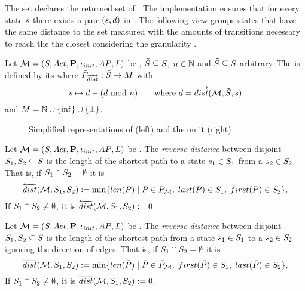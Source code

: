 \documentclass[preview]{standalone}
\begin{document}
The set \fctdistdefault declares the returned set of . The implementation ensures that for every state ${s}$ there exists a pair $({s}, {d})$ in \fctdistdefault. The following view groups states that have the same distance to the set measured with the amounts of transitions necessary to reach the the closest \smstates considering the granularity \grandist.

\begin{definition}
		Let ${{{\mathcal{M}}}} = {{({S}, {Act}, {\textbf{P}}, {\iota_{init}}, {AP}, {L})}}$ be \achgphN, ${\tilde{{S}}} \subseteq {S}$, $n \in {\mathbb{N}}$ and ${\tilde{{S}}} \subseteq {S}$ arbitrary.  The \viewN \viewdistance is defined by its \grpfctN where ${{\tilde{F}_{{{\overrightarrow{dist}}}}}} : {\tilde{{S}}} \to {\ensuremath{{M}}}$ with 
		\[
		{s} \mapsto {d} - ({d} \text{ mod } n) \quad \quad \text{where } {d} = {\overrightarrow{dist}}({{{\mathcal{M}}}},{\tilde{{S}}}, {s})
		\]
		and ${{M}} = {\mathbb{N}} \cup \{\inf\} \cup {\{\bot\}}$.
\end{definition}

\begin{figure}[h]
	\begin{minipage}{.6\textwidth}
		
	\end{minipage}%
	\begin{minipage}{.5\textwidth}
		
	\end{minipage}
	\caption{Simplified representations of \mdp (left) and the \viewN \viewdistance on it (right)}
	\label{fig:Distance}  
\end{figure}

\begin{definition}
	Let ${{{\mathcal{M}}}} = {{({S}, {Act}, {\textbf{P}}, {\iota_{init}}, {AP}, {L})}}$ be \achgphN. The \emph{reverse distance} between disjoint ${S}_1, {S}_2 \subseteq {S}$ is the length of the shortest path to a state ${s}_1 \in {S}_1$ from a ${s}_2 \in {S}_2$. That is, if ${S}_1 \cap {S}_2 = \emptyset$ it is		
	\[
	\distpathrev(\chgph, \states_1, \states_2) := \min\{\lenpath(\path) \mid \path \in \pathset, \; \plast(\path) \in \states_1, \; \pfirst(\path) \in \states_2\},
	\]
	\noindent
	If ${S}_1 \cap {S}_2 \neq \emptyset$, it is ${\overleftarrow{dist}}({{{\mathcal{M}}}}, {S}_1, {S}_2) := 0$.
\end{definition}

\begin{definition}
	Let ${{{\mathcal{M}}}} = {{({S}, {Act}, {\textbf{P}}, {\iota_{init}}, {AP}, {L})}}$ be \achgphN. The \emph{reverse distance} between disjoint ${S}_1, {S}_2 \subseteq {S}$ is the length of the shortest path from a state ${s}_1 \in {S}_1$ to a ${s}_2 \in {S}_2$ ignoring the direction of edges. That is, if ${S}_1 \cap {S}_2 = \emptyset$ it is		
	\[
	\distpathbi(\chgph, \states_1, \states_2) := \min\{\lenpath(\pathbi) \mid \pathbi \in \pathbiset, \; \pfirst(\pathbi) \in \states_1, \; \plast(\pathbi) \in \states_2\},
	\]
	\noindent
	If ${S}_1 \cap {S}_2 \neq \emptyset$, it is ${\overline{dist}}({{{\mathcal{M}}}}, {S}_1, {S}_2) := 0$.
\end{definition}
\end{document}
